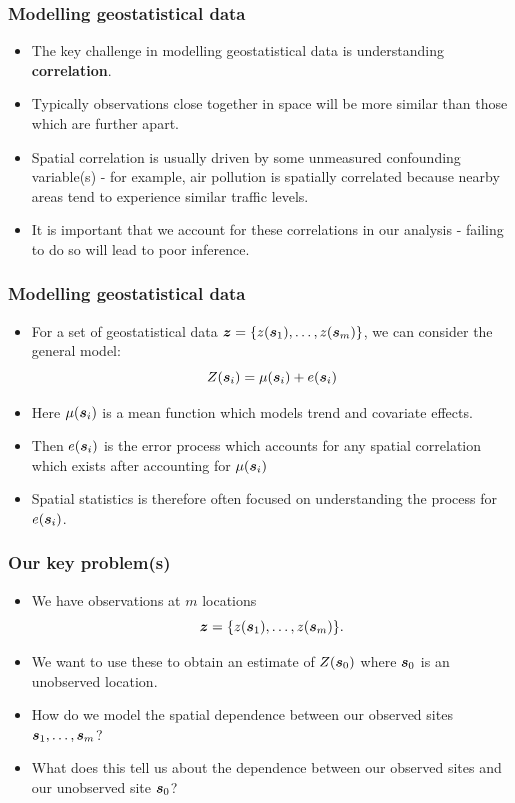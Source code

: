 \documentclass[parskip,12pt]{beamer}
\newcommand{\bd}[1]{\ensuremath{\mbox{\boldmath $#1$}}}
\begin{document}
\begin{frame}
\frametitle{Modelling geostatistical data}
 \begin{itemize}
\item The key challenge in modelling geostatistical data is understanding \textbf{correlation}.
\vspace{3mm}
\item Typically observations close together in space will be more similar than those which are further apart.
\vspace{3mm}
\item Spatial correlation is usually driven by some unmeasured confounding variable(s) - for example, air pollution is spatially correlated because nearby areas tend to experience similar traffic levels.
\vspace{3mm}
\item It is important that we account for these correlations in our analysis - failing to do so will lead to poor inference.
\end{itemize}
\end{frame}

\begin{frame}
\frametitle{Modelling geostatistical data}
 \begin{itemize}
\item For a set of geostatistical data $\bd{z} = \{ z(\bd{s}_1), \ldots, z(\bd{s}_m) \}$, we can consider the general model: $$Z(\bd{s}_i) = \mu(\bd{s}_i) + e(\bd{s}_i)$$
\item Here $\mu(\bd{s}_i)$ is a mean function which models trend and covariate effects.
\vspace{3mm}
\item Then $e(\bd{s}_i)$ is the error process which accounts for any spatial correlation which exists after accounting for $\mu(\bd{s}_i)$
\vspace{3mm}
\item Spatial statistics is therefore often focused on understanding the process for $e(\bd{s}_i)$.
\end{itemize}
\end{frame}

\begin{frame}
\frametitle{Our key problem(s)}
 \begin{itemize}
\item We have observations at $m$ locations $$\bd{z} = \{ z(\bd{s}_1), \ldots, z(\bd{s}_m) \}.$$
\item We want to use these to obtain an estimate of $Z(\bd{s}_0)$ where $\bd{s}_0$ is an unobserved location.
\vspace{3mm}
\item How do we model the spatial dependence between our observed sites $\bd{s}_1, \ldots, \bd{s}_m$?
\vspace{3mm}
\item What does this tell us about the dependence between our observed sites and our unobserved site $\bd{s}_0$?
\end{itemize}
\end{frame}
\end{document}
